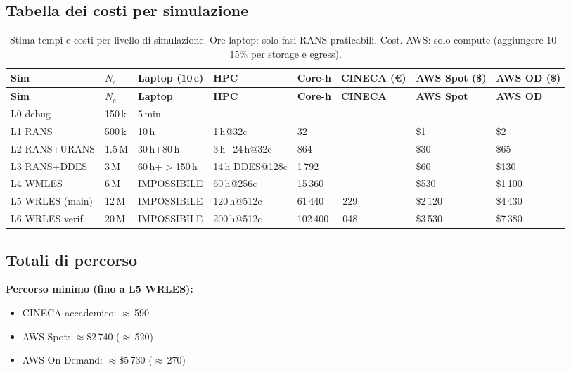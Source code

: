 \documentclass[11pt,a4paper]{article}
\begin{document}
\subsection{Tabella dei costi per simulazione}

\begin{longtable}{p{1.5cm}p{0.9cm}p{2.2cm}p{2.0cm}p{1.3cm}p{1.5cm}p{1.8cm}p{1.8cm}}
  \caption{Stima tempi e costi per livello di simulazione. Ore laptop: solo fasi RANS praticabili. Cost. AWS: solo compute (aggiungere 10--15\% per storage e egress).}
  \label{tab:costi} \\
  \toprule
  \rowcolor{tablehead}
  \textbf{Sim} & $N_c$ & \textbf{Laptop} (10\,c) & \textbf{HPC} & \textbf{Core-h} & \textbf{CINECA} (€) & \textbf{AWS Spot} (\$) & \textbf{AWS OD} (\$) \\
  \midrule
  \endfirsthead
  \toprule
  \rowcolor{tablehead}
  \textbf{Sim} & $N_c$ & \textbf{Laptop} & \textbf{HPC} & \textbf{Core-h} & \textbf{CINECA} & \textbf{AWS Spot} & \textbf{AWS OD} \\
  \midrule
  \endhead
  \bottomrule
  \endfoot
  L0 debug & 150\,k & 5\,min & --- & --- & \texteuro 0 & --- & --- \\
  L1 RANS & 500\,k & 10\,h & 1\,h@32c & 32 & \texteuro 0.64 & \$1 & \$2 \\
  L2 RANS+URANS & 1.5\,M & 30\,h+80\,h & 3\,h+24\,h@32c & 864 & \texteuro 17 & \$30 & \$65 \\
  L3 RANS+DDES & 3\,M & 60\,h+$>$150\,h & 14\,h DDES@128c & 1\,792 & \texteuro 36 & \$60 & \$130 \\
  L4 WMLES & 6\,M & IMPOSSIBILE & 60\,h@256c & 15\,360 & \texteuro 307 & \$530 & \$1\,100 \\
  L5 WRLES (main) & 12\,M & IMPOSSIBILE & 120\,h@512c & 61\,440 & \texteuro 1\,229 & \$2\,120 & \$4\,430 \\
  L6 WRLES verif. & 20\,M & IMPOSSIBILE & 200\,h@512c & 102\,400 & \texteuro 2\,048 & \$3\,530 & \$7\,380 \\
\end{longtable}

\subsection{Totali di percorso}

\textbf{Percorso minimo (fino a L5 WRLES):}
\begin{itemize}
  \item CINECA accademico: $\approx$\,590
  \item AWS Spot: $\approx$\$2\,740 ($\approx$\,520)
  \item AWS On-Demand: $\approx$\$5\,730 ($\approx$\,270)
\end{itemize}
\end{document}
